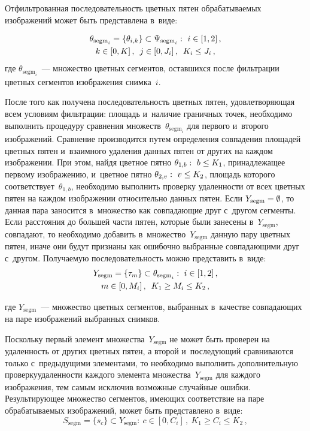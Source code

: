 \begin{multicols}{2}
  Отфильтрованная последовательность цветных пятен обрабатываемых 
изображений может быть представлена в~виде:

\noindent
  \begin{multline*}
  \theta_{\mathrm{segm}_i}= \{\theta_{i,k}\}\subset \Psi_{\mathrm{segm}_i}:\ i\in 
[1, 2]\,,\\
  k\in [0,  K]\,,\enskip j\in [0,  J_i]\,,\enskip K_i\leq J_i\,,
  \end{multline*}
где $\theta_{\mathrm{segm}_i}$~--- множество цветных сегментов, оставшихся 
после фильтрации цветных сегментов изоб\-ра\-же\-ния снимка~$i$.

  После того как получена последовательность цветных пятен, 
удовлетворяющая всем условиям фильтрации: площадь и~наличие граничных 
точек, необходимо выполнить процедуру сравнения множеств~$\theta_{\mathrm{segm}_i}$ 
для первого и~второго изображений. Сравнение 
производится путем определения совпадения площадей цветных пятен 
и~взаимного удаления данных пятен от других на каждом изоб\-ра\-же\-нии. При 
этом, найдя цветное пятно $\theta_{1,b}:\ b\hm\leq K_1$, принадлежащее 
первому изображению, и~цветное пятно $\theta_{2,v}:\ v\hm\leq K_2$, 
площадь которого соответствует~$\theta_{1,b}$, необходимо выполнить 
проверку удаленности от всех цветных пятен на каждом изображении 
относительно данных пятен. Если $Y_{\mathrm{segm}}\hm=\emptyset$, то данная пара 
заносится в~множество как совпадающие друг с~другом сегменты. Если 
расстояния до большей части пятен, которые были занесены в~$Y_{\mathrm{segm}}$, 
совпадают, то необходимо добавить в~множество~$Y_{\mathrm{segm}}$ данную пару 
цветных пятен, иначе они будут признаны как ошибочно выбранные 
совпадающими друг с~другом. Получа\-емую последовательность  можно 
представить в~виде:
  \begin{multline*}
  Y_{\mathrm{segm}} =\{\tau_m\}\subset \theta_{\mathrm{segm}_i}:\
  i\in [1, 2]\,,\\
  m\in [0,M_i]\,,\enskip K_1\geq M_i\leq K_2\,,
  \end{multline*}
  
  \columnbreak
  
\noindent
где $Y_{\mathrm{segm}}$~--- множество цветных сегментов, выбранных в~качестве 
совпадающих на паре изображений выбранных снимков.

  Поскольку первый элемент множества~$Y_{\mathrm{segm}}$ не может быть 
проверен на удаленность от других цветных пятен, а второй и~последующий 
сравниваются только с~предыдущими элементами, то необходимо выполнить 
дополнительную проверку\linebreak уда\-лен\-ности каждого элемента 
множества~$Y_{\mathrm{segm}}$ для каждого изоб\-ра\-же\-ния, тем самым исключив 
возможные случайные ошибки. Результирующее множество сегментов, 
имеющих соответствие на паре обрабатываемых изоб\-ра\-же\-ний, может быть 
представлено в~виде:
  \begin{equation*}
  S_{\mathrm{segm}}= \{s_c\}\subset Y_{\mathrm{segm}}:\ c\in [0,C_i]\,,\ K_1\geq C_i\leq K_2\,,
  \end{equation*}
  

\end{multicols}
